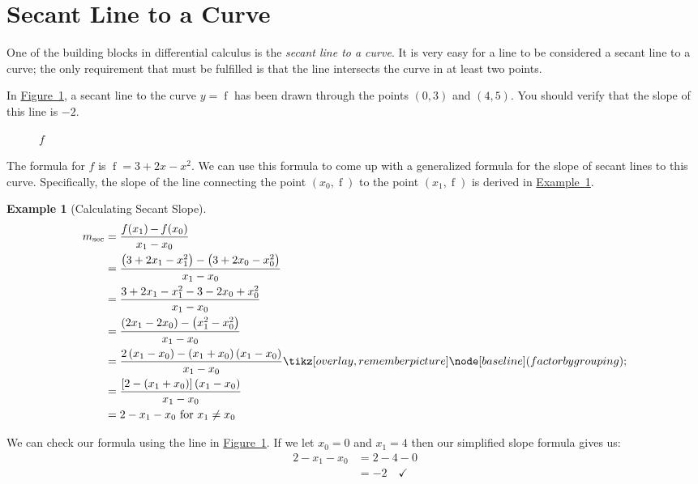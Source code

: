 \documentclass[12pt,]{book}
\theoremstyle{plain}
\theoremstyle{definition}
\newtheorem{example}[theorem]{Example}
\numberwithin{equation}{section}
\newcommand{\tikzmark}[1]{\tikz[overlay,remember picture] \node[baseline] (#1) {};}%
\newcommand{\fe}[2]{\mathop{{#1}{\left(#2\right)}}}
\newcommand{\point}[2]{\left(#1,#2\right)}
\begin{document}
\section[Secant Line to a Curve]{Secant Line to a Curve}\label{section-secant}
One of the building blocks in differential calculus is the \emph{secant line to a curve}. It is very easy for a line to be considered a secant line to a curve; the only requirement that must be fulfilled is that the line intersects the curve in at least two points.%
\par
In \hyperref[figure-secant]{Figure~\ref*{figure-secant}}, a secant line to the curve \(y=\fe{f}{x}\) has been drawn through the points \(\point{0}{3}\) and \(\point{4}{5}\). You should verify that the slope of this line is \(-2\).%
\begin{figure}
\centering
{
}
\caption{\(f\)\label{figure-secant}}
\end{figure}
\par
The formula for \(f\) is \(\fe{f}{x}=3+2x-x^2\). We can use this formula to come up with a generalized formula for the slope of secant lines to this curve. Specifically, the slope of the line connecting the point \(\point{x_0}{\fe{f}{x_0}}\) to the point \(\point{x_1}{\fe{f}{x_1}}\) is derived in \hyperref[example-secant]{Example~\ref*{example-secant}}.%
\begin{example}[Calculating Secant Slope]\label{example-secant}
\begin{align*}
m_{\text{sec}}&=\frac{\fe{f}{x_1}-\fe{f}{x_0}}{x_1-x_0}\\
&=\frac{\left(3+2x_1-x_1^2\right)-\left(3+2x_0-x_0^2\right)}{x_1-x_0}\\
&=\frac{3+2x_1-x_1^2-3-2x_0+x_0^2}{x_1-x_0}\\
&=\frac{\left(2x_1-2x_0\right)-\left(x_1^2-x_0^2\right)}{x_1-x_0}\\
&=\frac{2\left(x_1-x_0\right)-\left(x_1+x_0\right)\left(x_1-x_0\right)}{x_1-x_0}\tikzmark{factor by grouping}\\
&=\frac{\left[2-\left(x_1+x_0\right)\right]\left(x_1-x_0\right)}{x_1-x_0}\\
&=2-x_1-x_0\text{ for }x_1\neq x_0
\end{align*}
\par
We can check our formula using the line in \hyperref[figure-secant]{Figure~\ref*{figure-secant}}. If we let \(x_0=0\) and \(x_1=4\) then our simplified slope formula gives us:\begin{align*}
2-x_1-x_0&=2-4-0\\
&=-2\quad\checkmark
\end{align*}%
\end{example}
\end{document}
